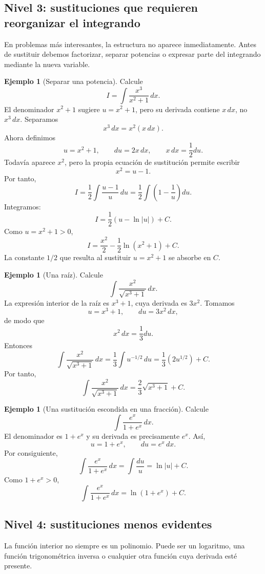 \documentclass[12pt]{article}
\theoremstyle{definition}
\newtheorem{ejemplo}[teorema]{Ejemplo}
\theoremstyle{remark}
\begin{document}
\subsection*{Nivel 3: sustituciones que requieren reorganizar el integrando}

En problemas más interesantes, la estructura no aparece inmediatamente. Antes de sustituir debemos factorizar, separar potencias o expresar parte del integrando mediante la nueva variable.

\begin{ejemplo}[Separar una potencia]
Calcule
\[
I=\int\frac{x^3}{x^2+1}\,dx.
\]
El denominador $x^2+1$ sugiere $u=x^2+1$, pero su derivada contiene $x\,dx$, no $x^3\,dx$. Separamos
\[
x^3\,dx=x^2(x\,dx).
\]
Ahora definimos
\[
u=x^2+1,\qquad du=2x\,dx,
\qquad x\,dx=\frac12du.
\]
Todavía aparece $x^2$, pero la propia ecuación de sustitución permite escribir
\[
x^2=u-1.
\]
Por tanto,
\[
I=\frac12\int\frac{u-1}{u}\,du
=\frac12\int\left(1-\frac1u\right)du.
\]
Integramos:
\[
I=\frac12(u-\ln|u|)+C.
\]
Como $u=x^2+1>0$,
\[
\boxed{I=\frac{x^2}{2}-\frac12\ln(x^2+1)+C.}
\]
La constante $1/2$ que resulta al sustituir $u=x^2+1$ se absorbe en $C$.
\end{ejemplo}

\begin{ejemplo}[Una raíz]
Calcule
\[
\int\frac{x^2}{\sqrt{x^3+1}}\,dx.
\]
La expresión interior de la raíz es $x^3+1$, cuya derivada es $3x^2$. Tomamos
\[
u=x^3+1,\qquad du=3x^2\,dx,
\]
de modo que
\[
x^2\,dx=\frac13du.
\]
Entonces
\[
\int\frac{x^2}{\sqrt{x^3+1}}\,dx
=\frac13\int u^{-1/2}\,du
=\frac13(2u^{1/2})+C.
\]
Por tanto,
\[
\boxed{\int\frac{x^2}{\sqrt{x^3+1}}\,dx=\frac23\sqrt{x^3+1}+C.}
\]
\end{ejemplo}

\begin{ejemplo}[Una sustitución escondida en una fracción]
Calcule
\[
\int\frac{e^x}{1+e^x}\,dx.
\]
El denominador es $1+e^x$ y su derivada es precisamente $e^x$. Así,
\[
u=1+e^x,\qquad du=e^x\,dx.
\]
Por consiguiente,
\[
\int\frac{e^x}{1+e^x}\,dx
=\int\frac{du}{u}
=\ln|u|+C.
\]
Como $1+e^x>0$,
\[
\boxed{\int\frac{e^x}{1+e^x}\,dx=\ln(1+e^x)+C.}
\]
\end{ejemplo}

\subsection*{Nivel 4: sustituciones menos evidentes}

La función interior no siempre es un polinomio. Puede ser un logaritmo, una función trigonométrica inversa o cualquier otra función cuya derivada esté presente.
\end{document}
